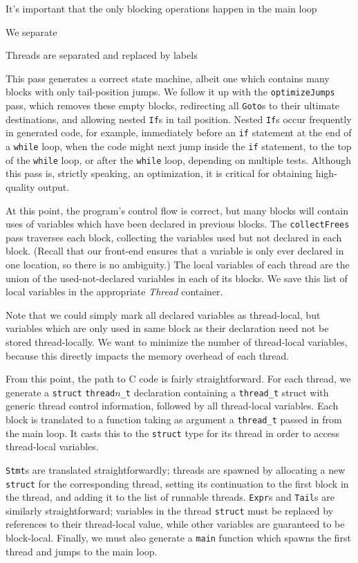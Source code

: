 \documentclass[preprint,11pt]{sigplanconf}
\renewcommand{\t}{\texttt}
\renewcommand{\i}{\textit}
\begin{document}
It's important that the only blocking operations happen in the main loop

We separate 

Threads are separated and replaced by labels

This pass generates a correct state machine, albeit one which contains many
blocks with only tail-position jumps. We follow it up with the \t{optimizeJumps}
pass, which removes these empty blocks, redirecting all \t{Goto}s to their
ultimate destinations, and allowing nested \t{If}s in tail position. Nested
\t{If}s occur frequently in generated code, for example, immediately before an
\t{if} statement at the end of a \t{while} loop, when the code might next jump
inside the \t{if} statement, to the top of the \t{while} loop, or after the
\t{while} loop, depending on multiple tests. Although this pass is, strictly
speaking, an optimization, it is critical for obtaining high-quality output.

At this point, the program's control flow is correct, but many blocks will
contain uses of variables which have been declared in previous blocks. The
\t{collectFrees} pass traverses each block, collecting the variables used but
not declared in each block. (Recall that our front-end ensures that a variable
is only ever declared in one location, so there is no ambiguity.) The local
variables of each thread are the union of the used-not-declared variables in
each of its blocks. We save this list of local variables in the appropriate
\i{Thread} container.

Note that we could simply mark all declared variables as thread-local, but
variables which are only used in same block as their declaration need not be
stored thread-locally. We want to minimize the number of thread-local variables,
because this directly impacts the memory overhead of each thread.

From this point, the path to C code is fairly straightforward. For each thread,
we generate a \t{struct} \t{thread$n$\_t} declaration containing a \t{thread\_t}
struct with generic thread control information, followed by all thread-local
variables. Each block is translated to a function taking as argument a
\t{thread\_t} passed in from the main loop. It casts this to the \t{struct} type
for its thread in order to access thread-local variables.

\t{Stmt}s are translated straightforwardly; threads are spawned by allocating a
new \t{struct} for the corresponding thread, setting its continuation to the
first block in the thread, and adding it to the list of runnable threads.
\t{Expr}s and \t{Tail}s are similarly straightforward; variables in the thread
\t{struct} must be replaced by references to their thread-local value, while
other variables are guaranteed to be block-local. Finally, we must also generate
a \t{main} function which spawns the first thread and jumps to the main loop.
  
\end{document}
